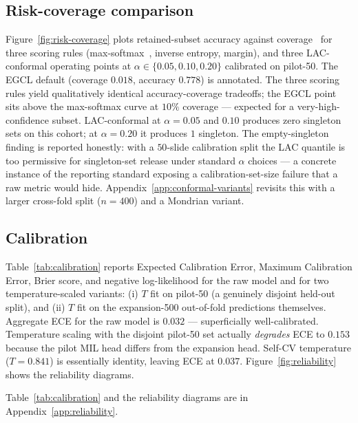 \documentclass{article}
\newcommand{\SafeNum}[1]{#1}
\begin{document}
\subsection{Risk-coverage comparison}
\label{sec:risk-coverage}

Figure~\ref{fig:risk-coverage} plots retained-subset accuracy against coverage~\citep{jaeger2023failure} for three scoring rules (max-softmax~\citep{hendrycks2017msp}, inverse entropy, margin), and three LAC-conformal operating points at $\alpha \in \{\SafeNum{0.05}, \SafeNum{0.10}, \SafeNum{0.20}\}$ calibrated on pilot-50. The EGCL default (coverage $\SafeNum{0.018}$, accuracy $\SafeNum{0.778}$) is annotated. The three scoring rules yield qualitatively identical accuracy-coverage tradeoffs; the EGCL point sits above the max-softmax curve at $\SafeNum{10}\%$ coverage --- expected for a very-high-confidence subset. LAC-conformal at $\alpha=\SafeNum{0.05}$ and $\SafeNum{0.10}$ produces zero singleton sets on this cohort; at $\alpha=\SafeNum{0.20}$ it produces $\SafeNum{1}$ singleton. The empty-singleton finding is reported honestly: with a $\SafeNum{50}$-slide calibration split the LAC quantile is too permissive for singleton-set release under standard $\alpha$ choices --- a concrete instance of the reporting standard exposing a calibration-set-size failure that a raw metric would hide. Appendix~\ref{app:conformal-variants} revisits this with a larger cross-fold split ($n{=}\SafeNum{400}$) and a Mondrian variant.


\subsection{Calibration}
\label{sec:calibration}

Table~\ref{tab:calibration} reports Expected Calibration Error, Maximum Calibration Error, Brier score, and negative log-likelihood for the raw model and for two temperature-scaled variants: (i) $T$ fit on pilot-50 (a genuinely disjoint held-out split), and (ii) $T$ fit on the expansion-500 out-of-fold predictions themselves. Aggregate ECE for the raw model is $\SafeNum{0.032}$ --- superficially well-calibrated. Temperature scaling with the disjoint pilot-50 set actually \emph{degrades} ECE to $\SafeNum{0.153}$ because the pilot MIL head differs from the expansion head. Self-CV temperature ($T=\SafeNum{0.841}$) is essentially identity, leaving ECE at $\SafeNum{0.037}$. Figure~\ref{fig:reliability} shows the reliability diagrams.


Table~\ref{tab:calibration} and the reliability diagrams are in Appendix~\ref{app:reliability}.
\end{document}
